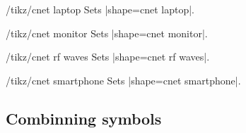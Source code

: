\documentclass[a4paper]{ltxdoc}
\begin{document}
\begin{stylekey}{/tikz/cnet laptop}
Sets |shape={cnet laptop}|.
\begin{codeexample}[preamble={\usetikzlibrary{shapes.cnet.laptop}}]
\end{codeexample}
\end{stylekey}

\begin{stylekey}{/tikz/cnet monitor}
Sets |shape={cnet monitor}|.
\begin{codeexample}[preamble={\usetikzlibrary{shapes.cnet.monitor}}]
\end{codeexample}
\end{stylekey}

\begin{stylekey}{/tikz/cnet rf waves}
Sets |shape={cnet rf waves}|.
\begin{codeexample}[preamble={\usetikzlibrary{shapes.cnet.rfwaves}}]
\end{codeexample}
\end{stylekey}

\begin{stylekey}{/tikz/cnet smartphone}
Sets |shape={cnet smartphone}|.
\begin{codeexample}[preamble={\usetikzlibrary{shapes.cnet.smartphone}}]
\end{codeexample}
\end{stylekey}

\subsection{Combinning symbols}
\label{sec: combining-symbols}

\begin{codeexample}[preamble={\usetikzlibrary{shapes.cnet.car}}]
\end{codeexample}

\begin{codeexample}[preamble={\usetikzlibrary{shapes.cnet.smartphone}}]
\end{codeexample}
\end{document}
